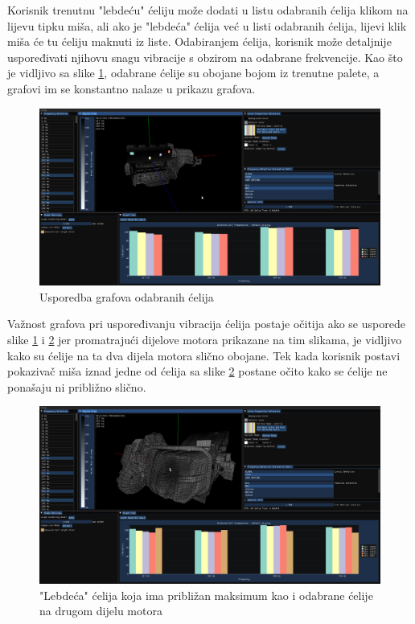 \documentclass[times, utf8, diplomski]{fer}
\begin{document}
Korisnik trenutnu "lebdeću" ćeliju može dodati u listu odabranih ćelija klikom na lijevu tipku miša, ali ako je "lebdeća" ćelija već u listi odabranih ćelija, lijevi klik miša će tu ćeliju maknuti iz liste. Odabiranjem ćelija, korisnik može detaljnije uspoređivati njihovu snagu vibracije s obzirom na odabrane frekvencije. Kao što je vidljivo sa slike \ref{fig:selected-cells-graphs}, odabrane ćelije su obojane bojom iz trenutne palete, a grafovi im se konstantno nalaze u prikazu grafova. 

\begin{figure} [H]
	\centering
    \includegraphics[width=\textwidth]{demonstration/selected_cells_max.png}
    \caption{Usporedba grafova odabranih ćelija}
    \label{fig:selected-cells-graphs}
\end{figure}

Važnost grafova pri uspoređivanju vibracija ćelija postaje očitija ako se usporede slike \ref{fig:selected-cells-graphs} i \ref{fig:hovered-cell-selected-cells} jer promatrajući dijelove motora prikazane na tim slikama, je vidljivo kako su ćelije na ta dva dijela motora slično obojane. Tek kada korisnik postavi pokazivač miša iznad jedne od ćelija sa slike \ref{fig:hovered-cell-selected-cells} postane očito kako se ćelije ne ponašaju ni približno slično.

\begin{figure} [H]
	\centering
    \includegraphics[width=\textwidth]{demonstration/hovered_cell_max.png}
    \caption{"Lebdeća" ćelija koja ima približan maksimum kao i odabrane ćelije na drugom dijelu motora}
    \label{fig:hovered-cell-selected-cells}
\end{figure}
\end{document}
